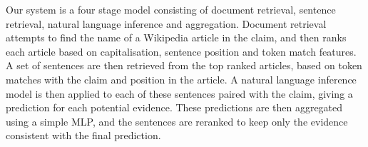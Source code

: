 Our system is a four stage model consisting of document retrieval, sentence retrieval, natural language inference and aggregation. Document retrieval attempts to find the name of a Wikipedia article in the claim, and then ranks each article based on capitalisation, sentence position and token match features. A set of sentences are then retrieved from the top ranked articles, based on token matches with the claim and position in the article. A natural language inference model is then applied to each of these sentences paired with the claim, giving a prediction for each potential evidence. These predictions are then aggregated using a simple MLP, and the sentences are reranked to keep only the evidence consistent with the final prediction.
